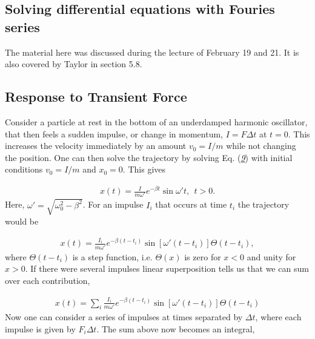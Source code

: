 \documentclass[letterpaper,10pt,english]{sphinxmanual}
\begin{document}
\subsection{Solving differential equations with Fouries series}
\label{\detokenize{chapter4:solving-differential-equations-with-fouries-series}}
The material here was discussed during the lecture of February 19 and 21.
It is also covered by Taylor in section 5.8.


\subsection{Response to Transient Force}
\label{\detokenize{chapter4:response-to-transient-force}}
Consider a particle at rest in the bottom of an underdamped harmonic
oscillator, that then feels a sudden impulse, or change in momentum,
\(I=F\Delta t\) at \(t=0\). This increases the velocity immediately by an
amount \(v_0=I/m\) while not changing the position. One can then solve
the trajectory by solving Eq. ({\hyperref[\detokenize{chapter4:eq:homogsolution}]{\emph{9}}}) with initial
conditions \(v_0=I/m\) and \(x_0=0\). This gives




\begin{equation*}
\begin{split}
\begin{equation}
x(t)=\frac{I}{m\omega'}e^{-\beta t}\sin\omega't, ~~t>0.
\label{_auto29} \tag{41}
\end{equation}
\end{split}
\end{equation*}
Here, \(\omega'=\sqrt{\omega_0^2-\beta^2}\). For an impulse \(I_i\) that
occurs at time \(t_i\) the trajectory would be




\begin{equation*}
\begin{split}
\begin{equation}
x(t)=\frac{I_i}{m\omega'}e^{-\beta (t-t_i)}\sin[\omega'(t-t_i)] \Theta(t-t_i),
\label{_auto30} \tag{42}
\end{equation}
\end{split}
\end{equation*}
where \(\Theta(t-t_i)\) is a step function, i.e. \(\Theta(x)\) is zero for
\(x<0\) and unity for \(x>0\). If there were several impulses linear
superposition tells us that we can sum over each contribution,




\begin{equation*}
\begin{split}
\begin{equation}
x(t)=\sum_i\frac{I_i}{m\omega'}e^{-\beta(t-t_i)}\sin[\omega'(t-t_i)]\Theta(t-t_i)
\label{_auto31} \tag{43}
\end{equation}
\end{split}
\end{equation*}
Now one can consider a series of impulses at times separated by
\(\Delta t\), where each impulse is given by \(F_i\Delta t\). The sum
above now becomes an integral,
\end{document}

